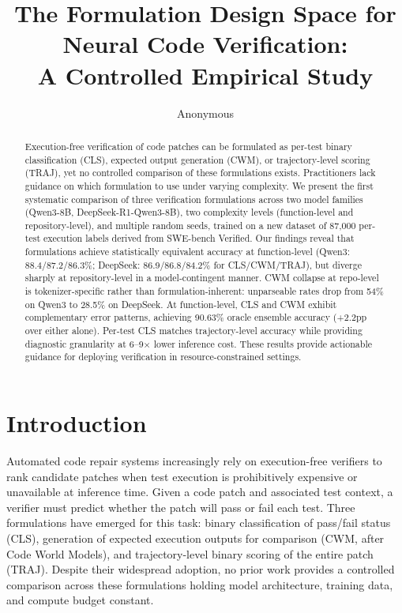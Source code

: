 \documentclass[11pt]{article}
\title{The Formulation Design Space for Neural Code Verification:\\A Controlled Empirical Study}
\author{Anonymous}
\date{}
\begin{document}
\maketitle

\begin{abstract}
Execution-free verification of code patches can be formulated as per-test binary classification (CLS), expected output generation (CWM), or trajectory-level scoring (TRAJ), yet no controlled comparison of these formulations exists. Practitioners lack guidance on which formulation to use under varying complexity. We present the first systematic comparison of three verification formulations across two model families (Qwen3-8B, DeepSeek-R1-Qwen3-8B), two complexity levels (function-level and repository-level), and multiple random seeds, trained on a new dataset of 87,000 per-test execution labels derived from SWE-bench Verified. Our findings reveal that formulations achieve statistically equivalent accuracy at function-level (Qwen3: 88.4/87.2/86.3\%; DeepSeek: 86.9/86.8/84.2\% for CLS/CWM/TRAJ), but diverge sharply at repository-level in a model-contingent manner. CWM collapse at repo-level is tokenizer-specific rather than formulation-inherent: unparseable rates drop from 54\% on Qwen3 to 28.5\% on DeepSeek. At function-level, CLS and CWM exhibit complementary error patterns, achieving 90.63\% oracle ensemble accuracy (+2.2pp over either alone). Per-test CLS matches trajectory-level accuracy while providing diagnostic granularity at 6--9$\times$ lower inference cost. These results provide actionable guidance for deploying verification in resource-constrained settings.
\end{abstract}

\section{Introduction}

Automated code repair systems increasingly rely on execution-free verifiers to rank candidate patches when test execution is prohibitively expensive or unavailable at inference time. Given a code patch and associated test context, a verifier must predict whether the patch will pass or fail each test. Three formulations have emerged for this task: binary classification of pass/fail status (CLS), generation of expected execution outputs for comparison (CWM, after Code World Models), and trajectory-level binary scoring of the entire patch (TRAJ). Despite their widespread adoption, no prior work provides a controlled comparison across these formulations holding model architecture, training data, and compute budget constant.
\end{document}
